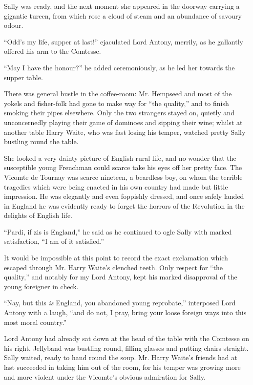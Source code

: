 \documentclass[paper=a5,BCOR=7mm,twoside,DIV=calc,12pt,usegeometry,chapterprefix,endperiod,headings=big]{scrbook}
\begin{document}
Sally was ready, and the next moment she appeared in the doorway carrying a gigantic tureen, from which rose a cloud of steam and an abundance of savoury odour.

\enquote{Odd's my life, supper at last!} ejaculated Lord Antony, merrily, as he gallantly offered his arm to the Comtesse.

\enquote{May I have the honour?} he added ceremoniously, as he led her towards the supper table.

There was general bustle in the coffee-room: Mr. Hempseed and most of the yokels and fisher-folk had gone to make way for \enquote{the quality,} and to finish smoking their pipes elsewhere. Only the two strangers stayed on, quietly and unconcernedly playing their game of dominoes and sipping their wine; whilst at another table Harry Waite, who was fast losing his temper, watched pretty Sally bustling round the table.

She looked a very dainty picture of English rural life, and no wonder that the susceptible young Frenchman could scarce take his eyes off her pretty face. The Vicomte de Tournay was scarce nineteen, a beardless boy, on whom the terrible tragedies which were being enacted in his own country had made but little impression. He was elegantly and even foppishly dressed, and once safely landed in England he was evidently ready to forget the horrors of the Revolution in the delights of English life.

\enquote{Pardi, if zis is England,} he said as he continued to ogle Sally with marked satisfaction, \enquote{I am of it satisfied.}

It would be impossible at this point to record the exact exclamation which escaped through Mr. Harry Waite's clenched teeth. Only respect for \enquote{the quality,} and notably for my Lord Antony, kept his marked disapproval of the young foreigner in check.

\enquote{Nay, but this \textit{is} England, you abandoned young reprobate,} interposed Lord Antony with a laugh, \enquote{and do not, I pray, bring your loose foreign ways into this most moral country.}

Lord Antony had already sat down at the head of the table with the Comtesse on his right. Jellyband was bustling round, filling glasses and putting chairs straight. Sally waited, ready to hand round the soup. Mr. Harry Waite's friends had at last succeeded in taking him out of the room, for his temper was growing more and more violent under the Vicomte's obvious admiration for Sally.
\end{document}
